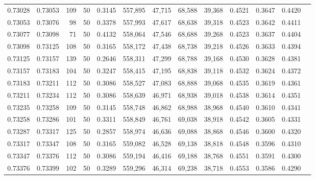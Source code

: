 \begin{tabular}{rrrrrrrrrrrrr}
0.73028 & 0.73053 &   109 &  50 &                                     0.3145 & 557,895 &  47,715 &  68,588 &  39,368 & 0.4521 & 0.3647 & 0.4420 \\
0.73053 & 0.73076 &    98 &  50 &                                     0.3378 & 557,993 &  47,617 &  68,638 &  39,318 & 0.4523 & 0.3642 & 0.4411 \\
0.73077 & 0.73098 &    71 &  50 &                                     0.4132 & 558,064 &  47,546 &  68,688 &  39,268 & 0.4523 & 0.3637 & 0.4404 \\
0.73098 & 0.73125 &   108 &  50 &                                     0.3165 & 558,172 &  47,438 &  68,738 &  39,218 & 0.4526 & 0.3633 & 0.4394 \\
0.73125 & 0.73157 &   139 &  50 &                                     0.2646 & 558,311 &  47,299 &  68,788 &  39,168 & 0.4530 & 0.3628 & 0.4381 \\
0.73157 & 0.73183 &   104 &  50 &                                     0.3247 & 558,415 &  47,195 &  68,838 &  39,118 & 0.4532 & 0.3624 & 0.4372 \\
0.73183 & 0.73211 &   112 &  50 &                                     0.3086 & 558,527 &  47,083 &  68,888 &  39,068 & 0.4535 & 0.3619 & 0.4361 \\
0.73211 & 0.73234 &   112 &  50 &                                     0.3086 & 558,639 &  46,971 &  68,938 &  39,018 & 0.4538 & 0.3614 & 0.4351 \\
0.73235 & 0.73258 &   109 &  50 &                                     0.3145 & 558,748 &  46,862 &  68,988 &  38,968 & 0.4540 & 0.3610 & 0.4341 \\
0.73258 & 0.73286 &   101 &  50 &                                     0.3311 & 558,849 &  46,761 &  69,038 &  38,918 & 0.4542 & 0.3605 & 0.4331 \\
0.73287 & 0.73317 &   125 &  50 &                                     0.2857 & 558,974 &  46,636 &  69,088 &  38,868 & 0.4546 & 0.3600 & 0.4320 \\
0.73317 & 0.73347 &   108 &  50 &                                     0.3165 & 559,082 &  46,528 &  69,138 &  38,818 & 0.4548 & 0.3596 & 0.4310 \\
0.73347 & 0.73376 &   112 &  50 &                                     0.3086 & 559,194 &  46,416 &  69,188 &  38,768 & 0.4551 & 0.3591 & 0.4300 \\
0.73376 & 0.73399 &   102 &  50 &                                     0.3289 & 559,296 &  46,314 &  69,238 &  38,718 & 0.4553 & 0.3586 & 0.4290 \\

\end{tabular}
